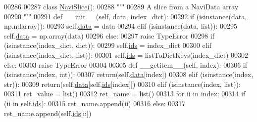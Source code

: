 \begin{DoxyCode}
00286 
00287 \textcolor{keyword}{class }\hyperlink{classnavicom_1_1navidata_1_1NaviSlice}{NaviSlice}():
00288     \textcolor{stringliteral}{"""}
00289 \textcolor{stringliteral}{    A slice from a NaviData array}
00290 \textcolor{stringliteral}{    """}
00291     \textcolor{keyword}{def }\_\_init\_\_(self, data, index\_dict):
\hypertarget{navidata_8py_source_l00292}{}\hyperlink{classnavicom_1_1navidata_1_1NaviSlice}{00292}         \textcolor{keywordflow}{if} (isinstance(data, np.ndarray)):
00293             self.\hyperlink{classnavicom_1_1navidata_1_1NaviSlice_a21ac86b9fbcb4ffc952782983690af5f}{data} = data
00294         \textcolor{keywordflow}{elif} (isinstance(data, list)):
00295             self.\hyperlink{classnavicom_1_1navidata_1_1NaviSlice_a21ac86b9fbcb4ffc952782983690af5f}{data} = np.array(data)
00296         \textcolor{keywordflow}{else}:
00297             \textcolor{keywordflow}{raise} TypeError
00298         \textcolor{keywordflow}{if} (isinstance(index\_dict, dict)):
00299             self.\hyperlink{classnavicom_1_1navidata_1_1NaviSlice_abc8769a0168ce54ee35624363deb0bcd}{ids} = index\_dict
00300         \textcolor{keywordflow}{elif} (isinstance(index\_dict, list)):
00301             self.\hyperlink{classnavicom_1_1navidata_1_1NaviSlice_abc8769a0168ce54ee35624363deb0bcd}{ids} = listToDictKeys(index\_dict)
00302         \textcolor{keywordflow}{else}:
00303             \textcolor{keywordflow}{raise} TypeError
00304 
00305     \textcolor{keyword}{def }\_\_getitem\_\_(self, index):
00306         \textcolor{keywordflow}{if} (isinstance(index, int)):
00307             \textcolor{keywordflow}{return}(self.\hyperlink{classnavicom_1_1navidata_1_1NaviSlice_a21ac86b9fbcb4ffc952782983690af5f}{data}[index])
00308         \textcolor{keywordflow}{elif} (isinstance(index, str)):
00309             \textcolor{keywordflow}{return}(self.\hyperlink{classnavicom_1_1navidata_1_1NaviSlice_a21ac86b9fbcb4ffc952782983690af5f}{data}[self.\hyperlink{classnavicom_1_1navidata_1_1NaviSlice_abc8769a0168ce54ee35624363deb0bcd}{ids}[index]])
00310         \textcolor{keywordflow}{elif} (isinstance(index, list)):
00311             ret\_value = list()
00312             ret\_name = list()
00313             \textcolor{keywordflow}{for} ii \textcolor{keywordflow}{in} index:
00314                 \textcolor{keywordflow}{if} (ii \textcolor{keywordflow}{in} self.\hyperlink{classnavicom_1_1navidata_1_1NaviSlice_abc8769a0168ce54ee35624363deb0bcd}{ids}):
00315                     ret\_name.append(ii)
00316                 \textcolor{keywordflow}{else}:
00317                     ret\_name.append(self.\hyperlink{classnavicom_1_1navidata_1_1NaviSlice_abc8769a0168ce54ee35624363deb0bcd}{ids}[ii])

\end{DoxyCode}
